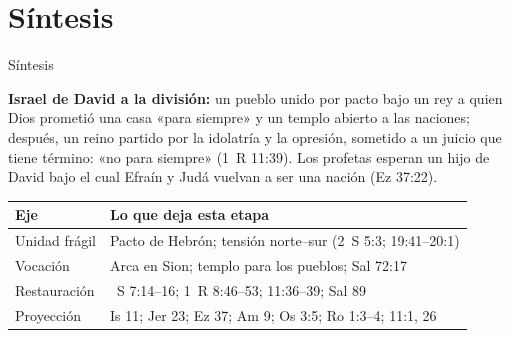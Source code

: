 \section{Síntesis}
\begin{frame}{Síntesis}
\begin{tcolorbox}[colback=piedra,colframe=ladrillo,boxrule=1pt,arc=3pt,fontupper=\footnotesize]
\textbf{\textcolor{cafe}{Israel de David a la división:}} un pueblo unido por pacto bajo un rey a quien Dios prometió una casa «para siempre» y un templo abierto a las naciones; después, un reino partido por la idolatría y la opresión, sometido a un juicio que tiene término: «no para siempre» (1~R 11:39). Los profetas esperan un hijo de David bajo el cual Efraín y Judá vuelvan a ser una nación (Ez 37:22).
\end{tcolorbox}
\vspace{2pt}
\centering\footnotesize\renewcommand{\arraystretch}{1.25}
\begin{tabular}{>{\RaggedRight\arraybackslash}p{2.6cm}>{\RaggedRight\arraybackslash}p{8.6cm}}
\toprule
\color{ladrillo}\bfseries Eje & \color{ladrillo}\bfseries Lo que deja esta etapa\\\midrule
Unidad frágil & Pacto de Hebrón; tensión norte--sur (2~S 5:3; 19:41--20:1)\\
Vocación & Arca en Sion; templo para los pueblos; Sal 72:17\\
Restauración & 2~S 7:14--16; 1~R 8:46--53; 11:36--39; Sal 89\\
Proyección & Is 11; Jer 23; Ez 37; Am 9; Os 3:5; Ro 1:3--4; 11:1, 26\\
\bottomrule
\end{tabular}
\elabpropia
\end{frame}

